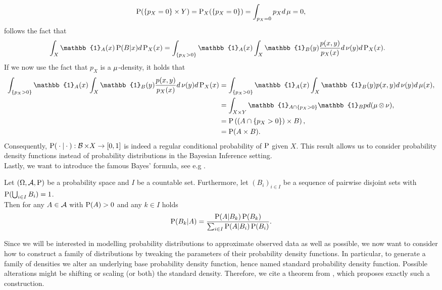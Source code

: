 \begin{align*}
\operatorname{\text{P}}(\{p_X = 0\} \times Y) = \operatorname{\text{P}}_X(\{p_X = 0\}) = \int_{p_X = 0} p_X d\operatorname{\mu} = 0,
\end{align*}
follows the fact that
\begin{align*}
\int_X \mathbb{1}_A(x) \prob(B|x)d\prob_X(x) &= \int_{\{p_X > 0\}} \mathbb{1}_A(x) \int_X \mathbb{1}_B(y) \frac{p(x, y)}{p_X(x)} d\n(y) d\prob_X(x).
\end{align*}
If we now use the fact that $p_X$ is a $\operatorname{\mu}$-density, it holds that
\begin{align*}
\int_{\{p_X > 0\}} \mathbb{1}_A(x) \int_X \mathbb{1}_B(y) \frac{p(x, y)}{p_X(x)} d\n(y) d\prob_X(x) &= \int_{\{p_X >0\}} \mathbb{1}_A(x) \int_X \mathbb{1}_B(y) p(x, y) d\n(y) d\m(x),\\
&= \int_{X \times Y} \mathbb{1}_{A \cap \{p_X > 0\}} \mathbb{1}_Bp d(\m \otimes \n),\\
&= \prob\left( (A \cap \{p_X > 0\}) \times B \right),\\
&= \prob (A \times B).
\end{align*}
Consequently, $\operatorname{\text{P}}({}\cdot{} |{}\cdot{}):\operatorname{\mathcal{B}} \times X\to [0, 1]$ is indeed a regular conditional probability of $\operatorname{\text{P}}$ given $X$. This result allows us to consider probability density functions instead of probability distributions in the Bayesian Inference setting.\\
Lastly, we want to introduce the famous Bayes' formula, see e.g \cite[Theorem~8.7]{klenke2013probability}.

\begin{theorem}\label{theorem:bayes_rule}
Let $(\Omega, \operatorname{\mathcal{A}}, \operatorname{\text{P}})$ be a probability space and $I$ be a countable set. Furthermore, let $(B_i)_{i\in I}$ be a sequence of pairwise disjoint sets with $\operatorname{\text{P}} (\bigcup_{i\in I} B_i) = 1$.\\
Then for any $A\in\operatorname{\mathcal{A}}$ with $\operatorname{\text{P}}(A) > 0$ and any $k\in I$ holds
\begin{align*}
\operatorname{\text{P}}(B_k | A) = \frac{\operatorname{\text{P}}(A | B_k) \operatorname{\text{P}}(B_k)}{\sum_{i \in I} \operatorname{\text{P}}(A | B_i) \operatorname{\text{P}}(B_i)}.
\end{align*}
\end{theorem}

Since we will be interested in modelling probability distributions to approximate observed data as well as possible, we now want to consider how to construct a family of distributions by tweaking the parameters of their probability density functions. In particular, to generate a family of densities we alter an underlying base probability density function, hence named standard probability density function. Possible alterations might be shifting or scaling (or both) the standard density. Therefore, we cite a theorem from \cite[Theorem~2.1]{cinelli2021variational}, which proposes exactly such a construction.

